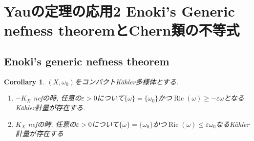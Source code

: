 \documentclass[dvipdfmx,a4paper,11pt]{article} %
\newtheorem{cor}[thm]{Corollary}
\theoremstyle{definition}
\theoremstyle{remark}
\numberwithin{equation}{section}
\DeclareMathOperator{\Ric}{Ric}
\begin{document}
 \newpage
 
 \section{Yauの定理の応用2 Enoki's Generic nefness theoremとChern類の不等式}
 
  \subsection{Enoki's generic nefness theorem}
  
 \begin{cor}
\label{cor-Yau-thm-2}
$(X, \omega_0)$をコンパクトK\"ahler多様体とする. 
\begin{enumerate}
\item $-K_X$ nefの時, 任意の$\varepsilon>0$について$\{ \omega\}=\{\omega_0\}$かつ$\Ric(\omega) \geq - \varepsilon \omega$となるK\"ahler計量が存在する.
\item $K_X$ nefの時, 任意の$\varepsilon>0$について$\{ \omega\}=\{\omega_0\}$かつ$\Ric(\omega) \leq \varepsilon \omega_0$なるK\"ahler計量が存在する
\end{enumerate}
\end{cor}
\end{document}
